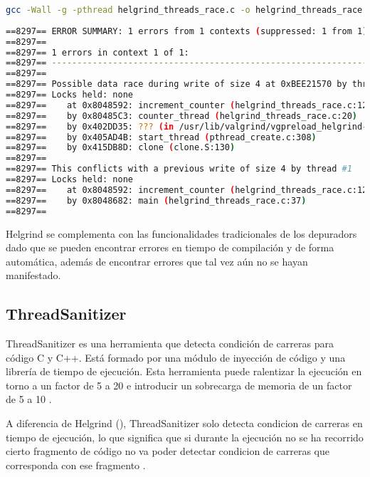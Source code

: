 \begin{lstlisting}[language=bash, caption={Muestra de salida de Helgrind al detectar un error de condición de carrera \cite{HelgrindUc3m}}]
gcc -Wall -g -pthread helgrind_threads_race.c -o helgrind_threads_race valgrind -v  --tool=helgrind  ./helgrind_threads_race
    
==8297== ERROR SUMMARY: 1 errors from 1 contexts (suppressed: 1 from 1)
==8297== 
==8297== 1 errors in context 1 of 1:
==8297== ----------------------------------------------------------------
==8297== 
==8297== Possible data race during write of size 4 at 0xBEE21570 by thread #2
==8297== Locks held: none
==8297==    at 0x8048592: increment_counter (helgrind_threads_race.c:12)
==8297==    by 0x80485C3: counter_thread (helgrind_threads_race.c:20)
==8297==    by 0x402DD35: ??? (in /usr/lib/valgrind/vgpreload_helgrind-x86-linux.so)
==8297==    by 0x405AD4B: start_thread (pthread_create.c:308)
==8297==    by 0x415DB8D: clone (clone.S:130)
==8297== 
==8297== This conflicts with a previous write of size 4 by thread #1
==8297== Locks held: none
==8297==    at 0x8048592: increment_counter (helgrind_threads_race.c:12)
==8297==    by 0x8048682: main (helgrind_threads_race.c:37)
==8297== 
\end{lstlisting}
    
Helgrind se complementa con las funcionalidades tradicionales de los \glspl{depurador} dado que se pueden encontrar errores en \gls{tiempo de compilación} y de forma automática, además de encontrar errores que tal vez aún no se hayan manifestado.

\subsection{ThreadSanitizer}{\label{subsec:thread-sanitizer}}

ThreadSanitizer es una herramienta que detecta \glspl{condición de carrera} para código C y C++. Está formado por una módulo de \gls{inyección de código} y una librería de \gls{tiempo de ejecución}. Esta herramienta puede ralentizar la ejecución en torno a un factor de 5 a 20 e introducir un sobrecarga de memoria de un factor de 5 a 10 \cite{ThreadSanitizer}.

A diferencia de Helgrind (), ThreadSanitizer solo detecta \glspl{condicion de carrera} en \gls{tiempo de ejecución}, lo que significa que si durante la ejecución no se ha recorrido cierto fragmento de código no va poder detectar \glspl{condicion de carrera} que corresponda con ese fragmento \cite{ThreadSanitizerGithub}.

